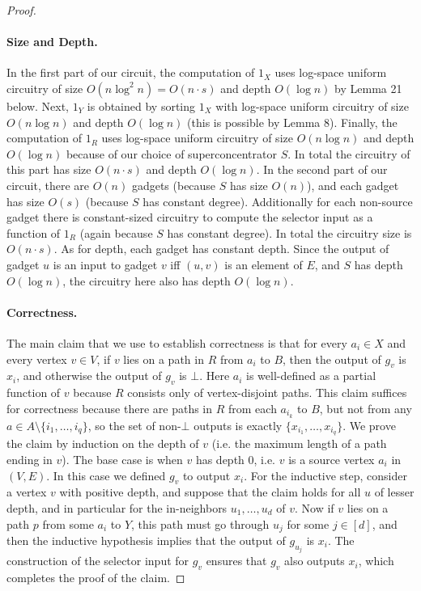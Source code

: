 \begin{proof}
\paragraph{Size and Depth.} In the first part of our circuit, the computation of $1_X$ uses log-space uniform circuitry of size $O(n\log^2n)=O(n\cdot s)$ and depth $O(\log n)$ by Lemma 21 below. Next, $1_Y$ is obtained by sorting $1_X$ with log-space uniform circuitry of size $O(n\log n)$ and depth $O(\log n)$ (this is possible by Lemma 8). Finally, the computation of $1_R$ uses log-space uniform circuitry of size $O(n\log n)$ and depth $O(\log n)$ because of our choice of superconcentrator $S$. In total the circuitry of this part has size $O(n\cdot s)$ and depth $O(\log n)$.
In the second part of our circuit, there are $O(n)$ gadgets (because $S$ has size $O(n)$), and each gadget has size $O(s)$ (because $S$ has constant degree). Additionally for each non-source gadget there is constant-sized circuitry to compute the selector input as a function of $1_R$ (again because $S$ has constant degree). In total the circuitry size is $O(n\cdot s)$. As for depth, each gadget has constant depth. Since the output of gadget $u$ is an input to gadget $v$ iff $(u,v)$ is an element of $E$, and $S$ has depth $O(\log n)$, the circuitry here also has depth $O(\log n)$.
\paragraph{Correctness.} The main claim that we use to establish correctness is that for every $a_i\in X$ and every vertex $v\in V$, if $v$ lies on a path in $R$ from $a_i$ to $B$, then the output of $g_v$ is $x_i$, and otherwise the output of $g_v$ is $\bot$. Here $a_i$ is well-defined as a partial function of $v$ because $R$ consists only of vertex-disjoint paths. This claim suffices for correctness because there are paths in $R$ from each $a_{i_k}$ to $B$, but not from any $a\in A\setminus\{i_1,\ldots,i_q\}$, so the set of non-$\bot$ outputs is exactly $\{x_{i_1},\ldots,x_{i_q}\}$.
We prove the claim by induction on the depth of $v$ (i.e. the maximum length of a path ending in $v$). The base case is when $v$ has depth 0, i.e. $v$ is a source vertex $a_i$ in $(V,E)$. In this case we defined $g_v$ to output $x_i$.
For the inductive step, consider a vertex $v$ with positive depth, and suppose that the claim holds for all $u$ of lesser depth, and in particular for the in-neighbors $u_1,\ldots,u_d$ of $v$. Now if $v$ lies on a path $p$ from some $a_i$ to $Y$, this path must go through $u_j$ for some $j\in[d]$, and then the inductive hypothesis implies that the output of $g_{u_j}$ is $x_i$. The construction of the selector input for $g_v$ ensures that $g_v$ also outputs $x_i$, which completes the proof of the claim.
\end{proof}
